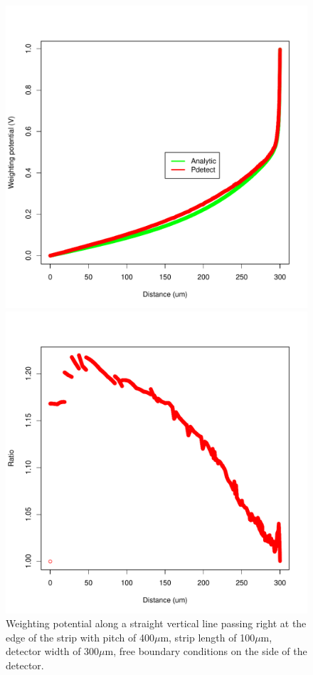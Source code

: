 \documentclass[11pt]{article}
\begin{document}
	\begin{figure}[H]
		\begin{minipage}[b]{.46\linewidth}
			\center
			\includegraphics[scale=0.5]{images/annexe/edge-strip.pdf}
			\caption{Weighting potential along a straight vertical line passing right at the edge
					of the strip with pitch
					of 400$\mu$m, strip length of 100$\mu$m, detector width of 300$\mu$m, free boundary conditions
					on the side of the detector.}
			\label{fig:edge_strip}
		\end{minipage} \hfill
		\begin{minipage}[b]{.46\linewidth}
			\center
			\includegraphics[scale=0.5]{images/annexe/edge-strip_ratio.pdf}

\end{minipage}
\end{figure}
\end{document}
